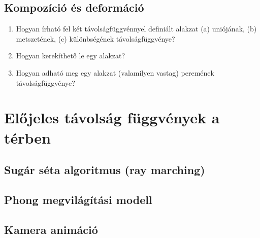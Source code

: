 \subsection{Kompozíció és deformáció}

\matfeladatok

\begin{enumerate}

\item Hogyan írható fel két távolságfüggvénnyel definiált alakzat
(a) uniójának,
(b) metszetének,
(c) különbségének távolságfüggvénye?

\item Hogyan kerekíthető le egy alakzat?

\item Hogyan adható meg egy alakzat (valamilyen vastag) peremének távolságfüggvénye?
\end{enumerate}


\section{Előjeles távolság függvények a térben}

\subsection{Sugár séta algoritmus (ray marching)}

\subsection{Phong megvilágítási modell}

\subsection{Kamera animáció}



